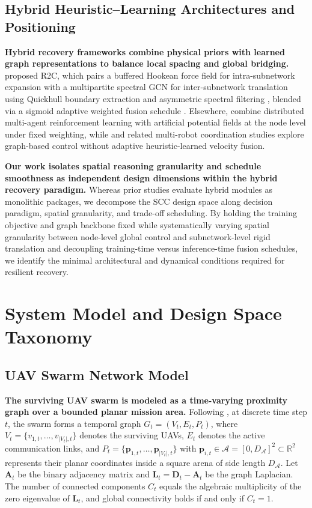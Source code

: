 \documentclass[11pt]{article}
\theoremstyle{plain}
\theoremstyle{definition}
\theoremstyle{remark}
\begin{document}
\subsection{Hybrid Heuristic--Learning Architectures and Positioning}
\label{sec:positioning}
\textbf{Hybrid recovery frameworks combine physical priors with learned graph representations to balance local spacing and global bridging.} \citet{peng2026r2c} proposed R2C, which pairs a buffered Hookean force field for intra-subnetwork expansion with a multipartite spectral GCN for inter-subnetwork translation using Quickhull boundary extraction \citep{barber1996quickhull} and asymmetric spectral filtering \citep{liu2025asymmetric}, blended via a sigmoid adaptive weighted fusion schedule \citep{elfwing2018sigmoid}. Elsewhere, \citet{li2025fast} combine distributed multi-agent reinforcement learning with artificial potential fields at the node level under fixed weighting, while \citet{wang2025uav} and related multi-robot coordination studies \citep{ye2022multiuav,mutzari2025heterogeneous,shi2025symmetry,kipf2016semi,zeng2023substructure} explore graph-based control without adaptive heuristic-learned velocity fusion.

\textbf{Our work isolates spatial reasoning granularity and schedule smoothness as independent design dimensions within the hybrid recovery paradigm.} Whereas prior studies evaluate hybrid modules as monolithic packages, we decompose the SCC design space along decision paradigm, spatial granularity, and trade-off scheduling. By holding the training objective and graph backbone fixed while systematically varying spatial granularity between node-level global control and subnetwork-level rigid translation and decoupling training-time versus inference-time fusion schedules, we identify the minimal architectural and dynamical conditions required for resilient recovery.

\section{System Model and Design Space Taxonomy}
\label{sec:prelim}

\subsection{UAV Swarm Network Model}
\textbf{The surviving UAV swarm is modeled as a time-varying proximity graph over a bounded planar mission area.} Following \citet{peng2026r2c}, at discrete time step $t$, the swarm forms a temporal graph $G_t = (V_t, E_t, P_t)$, where $V_t = \{v_{1,t}, \dots, v_{|V_t|,t}\}$ denotes the surviving UAVs, $E_t$ denotes the active communication links, and $P_t = \{\mathbf{p}_{1,t}, \dots, \mathbf{p}_{|V_t|,t}\}$ with $\mathbf{p}_{i,t} \in \mathcal{A} = [0, D_{\mathcal{A}}]^2 \subset \mathbb{R}^2$ represents their planar coordinates inside a square arena of side length $D_{\mathcal{A}}$. Let $\mathbf{A}_t$ be the binary adjacency matrix and $\mathbf{L}_t = \mathbf{D}_t - \mathbf{A}_t$ be the graph Laplacian. The number of connected components $C_t$ equals the algebraic multiplicity of the zero eigenvalue of $\mathbf{L}_t$, and global connectivity holds if and only if $C_t = 1$.
\end{document}
